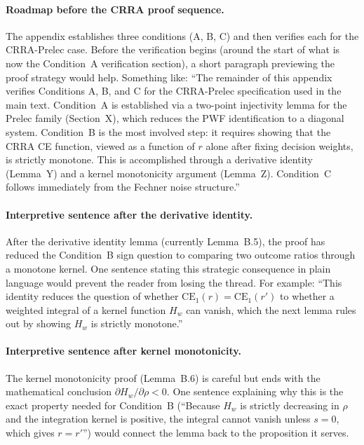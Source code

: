 \documentclass[11pt,a4paper]{article}
\begin{document}
\paragraph{Roadmap before the CRRA proof sequence.}
The appendix establishes three conditions (A, B, C) and then verifies
each for the CRRA-Prelec case. Before the verification begins (around
the start of what is now the Condition~A verification section),
a short paragraph previewing the proof strategy would help. Something
like: ``The remainder of this appendix verifies Conditions A, B, and C
for the CRRA-Prelec specification used in the main text. Condition~A is
established via a two-point injectivity lemma for the Prelec family
(Section~X), which reduces the PWF identification to a diagonal system.
Condition~B is the most involved step: it requires showing that the CRRA
CE function, viewed as a function of $r$ alone after fixing decision
weights, is strictly monotone. This is accomplished through a derivative
identity (Lemma~Y) and a kernel monotonicity argument (Lemma~Z).
Condition~C follows immediately from the Fechner noise structure.''

\paragraph{Interpretive sentence after the derivative identity.}
After the derivative identity lemma (currently Lemma~B.5), the proof has
reduced the Condition~B sign question to comparing two outcome ratios
through a monotone kernel. One sentence stating this strategic
consequence in plain language would prevent the reader from losing the
thread. For example: ``This identity reduces the question of whether
$\text{CE}_1(r) = \text{CE}_1(r')$ to whether a weighted integral of a
kernel function $H_w$ can vanish, which the next lemma rules out by
showing $H_w$ is strictly monotone.''

\paragraph{Interpretive sentence after kernel monotonicity.}
The kernel monotonicity proof (Lemma~B.6) is careful but ends with the
mathematical conclusion $\partial H_w / \partial \rho < 0$. One sentence
explaining why this is the exact property needed for Condition~B
(``Because $H_w$ is strictly decreasing in $\rho$ and the integration
kernel is positive, the integral cannot vanish unless $s = 0$, which
gives $r = r'$'') would connect the lemma back to the proposition it
serves.
\end{document}
